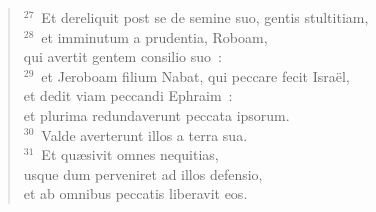 \begin{flushleft}\begin{verse}${}^{27}$~Et dereliquit post se de semine suo, gentis stultitiam,\\
${}^{28}$~et imminutum a prudentia, Roboam,\\ qui avertit gentem consilio suo~:\\
${}^{29}$~et Jeroboam filium Nabat, qui peccare fecit Isra\"el,\\ et dedit viam peccandi Ephraim~:\\ et plurima redundaverunt peccata ipsorum.\\
${}^{30}$~Valde averterunt illos a terra sua.\\
${}^{31}$~Et qu\ae sivit omnes nequitias,\\ usque dum perveniret ad illos defensio,\\ et ab omnibus peccatis liberavit eos.\end{verse}\end{flushleft}


